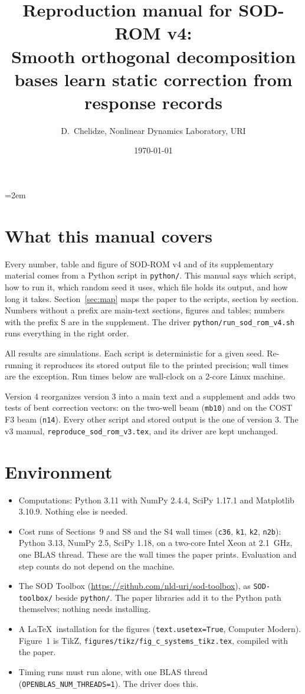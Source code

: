 \documentclass[10pt]{article}
\title{Reproduction manual for SOD-ROM v4:\\ \large Smooth orthogonal decomposition bases learn static correction from response records}
\author{D.~Chelidze, Nonlinear Dynamics Laboratory, URI}
\date{\today}
\newcommand{\f}[1]{\texttt{#1}}
\begin{document}
\emergencystretch=2em
\maketitle

\section{What this manual covers}
Every number, table and figure of SOD-ROM v4 and of its supplementary material comes from a Python script in \f{python/\allowbreak{}}.
This manual says which script, how to run it, which random seed it uses, which file holds its output, and how long it takes.
Section~\ref{sec:map} maps the paper to the scripts, section by section. Numbers without a prefix are main-text sections, figures and tables; numbers with the prefix S are in the supplement.
The driver \f{python/\allowbreak{}run\_\allowbreak{}sod\_\allowbreak{}rom\_\allowbreak{}v4.sh} runs everything in the right order.

All results are simulations. Each script is deterministic for a given seed. Re-running it reproduces its stored output file to the printed precision; wall times are the exception.
Run times below are wall-clock on a 2-core Linux machine.

Version 4 reorganizes version 3 into a main text and a supplement and adds two tests of bent correction vectors: on the two-well beam (\f{mb10}) and on the COST F3 beam (\f{n14}). Every other script and stored output is the one of version 3. The v3 manual, \f{reproduce\_\allowbreak{}sod\_\allowbreak{}rom\_\allowbreak{}v3.tex}, and its driver are kept unchanged.

\section{Environment}
\begin{itemize}
\item Computations: Python 3.11 with NumPy 2.4.4, SciPy 1.17.1 and Matplotlib 3.10.9. Nothing else is needed.
\item Cost runs of Sections~9 and S8 and the S4 wall times (\f{c36}, \f{k1}, \f{k2}, \f{n2b}): Python 3.13, NumPy 2.5, SciPy 1.18, on a two-core Intel Xeon at 2.1~GHz, one BLAS thread. These are the wall times the paper prints. Evaluation and step counts do not depend on the machine.
\item The SOD Toolbox (\url{https://github.com/nld-uri/sod-toolbox}), as \f{SOD-toolbox/\allowbreak{}} beside \f{python/\allowbreak{}}. The paper libraries add it to the Python path themselves; nothing needs installing.
\item A \LaTeX\ installation for the figures (\f{text.usetex=True}, Computer Modern). Figure~1 is TikZ, \f{figures/\allowbreak{}tikz/\allowbreak{}fig\_\allowbreak{}c\_\allowbreak{}systems\_\allowbreak{}tikz.tex}, compiled with the paper.
\item Timing runs must run alone, with one BLAS thread (\f{OPENBLAS\_\allowbreak{}NUM\_\allowbreak{}THREADS=1}). The driver does this.
\end{itemize}
\end{document}
